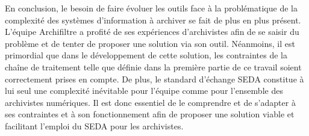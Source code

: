 En conclusion, le besoin de faire évoluer les outils face à la problématique de la complexité des systèmes d’information à archiver se fait de plus en plus présent. L’équipe \gls{Archifiltre} a profité de ses expériences d’archivistes afin de se saisir du problème et de tenter de proposer une solution via son outil. Néanmoins, il est primordial que dans le développement de cette solution, les contraintes de la chaîne de traitement telle que définie dans la première partie de ce travail soient correctement prises en compte. De plus, le standard d’échange \gls{SEDA} constitue à lui seul une complexité inévitable pour l’équipe comme pour l’ensemble des archivistes numériques. Il est donc essentiel de le comprendre et de s’adapter à ses contraintes et à son fonctionnement afin de proposer une solution viable et facilitant l’emploi du \gls{SEDA} pour les archivistes. 
